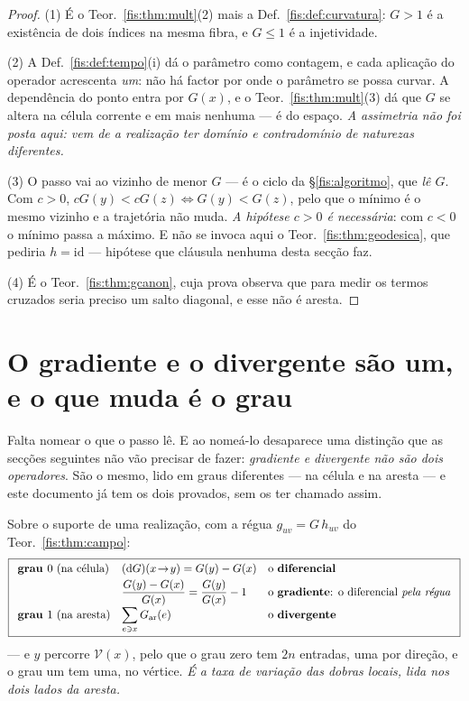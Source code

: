 \documentclass[livro.tex]{subfiles}
\begin{document}
\begin{proof}
(1) É o Teor.~\ref{fis:thm:mult}(2) mais a Def.~\ref{fis:def:curvatura}: $G>1$ é
a existência de dois índices na mesma fibra, e $G\le1$ é a injetividade.

(2) A Def.~\ref{fis:def:tempo}(i) dá o parâmetro como contagem, e cada aplicação
do operador acrescenta \emph{um}: não há factor por onde o parâmetro se possa
curvar. A dependência do ponto entra por $G(x)$, e o
Teor.~\ref{fis:thm:mult}(3) dá que $G$ se altera na célula corrente e em mais
nenhuma --- é do espaço. \emph{A assimetria não foi posta aqui: vem de a
realização ter domínio e contradomínio de naturezas diferentes.}

(3) O passo vai ao vizinho de menor $G$ --- é o ciclo da §\ref{fis:algoritmo},
que \emph{lê $G$}. Com $c>0$, $cG(y)<cG(z)\iff G(y)<G(z)$, pelo que o mínimo é o
mesmo vizinho e a trajetória não muda. \emph{A hipótese $c>0$ é necessária}: com
$c<0$ o mínimo passa a máximo. E não se invoca aqui o
Teor.~\ref{fis:thm:geodesica}, que pediria $h=\mathrm{id}$ --- hipótese que
cláusula nenhuma desta secção faz.

(4) É o Teor.~\ref{fis:thm:gcanon}, cuja prova observa que para medir os termos
cruzados seria preciso um salto diagonal, e esse não é aresta.
\end{proof}

\section{O gradiente e o divergente são um, e o que muda é o grau}\label{fis:grav-gradiente}

\noindent Falta nomear o que o passo lê. E ao nomeá-lo desaparece uma distinção
que as secções seguintes não vão precisar de fazer: \emph{gradiente e divergente
não são dois operadores}. São o mesmo, lido em graus diferentes --- na célula e
na aresta --- e este documento já tem os dois provados, sem os ter chamado assim.

\begin{definicao}\label{fis:def:grad}
Sobre o suporte de uma realização, com a régua $g_{uv}=G\,h_{uv}$ do
Teor.~\ref{fis:thm:campo}:
\[
\boxed{
\begin{array}{lll}
\textbf{grau }0\ \text{(na célula)} & (\mathrm{d}G)(x\!\to\! y)=G(y)-G(x) & \text{o \textbf{diferencial}}\\[3pt]
 & \dfrac{G(y)-G(x)}{G(x)}=\dfrac{G(y)}{G(x)}-1 & \text{o \textbf{gradiente}: o diferencial \emph{pela régua}}\\[6pt]
\textbf{grau }1\ \text{(na aresta)} & \displaystyle\sum_{e\ni x}G_{\mathrm{ar}}(e) & \text{o \textbf{divergente}}
\end{array}}
\]
--- e $y$ percorre $\mathcal{V}(x)$, pelo que o grau zero tem $2n$ entradas, uma
por direção, e o grau um tem uma, no vértice. \emph{É a taxa de variação das
dobras locais, lida nos dois lados da aresta.}
\end{definicao}
\end{document}
